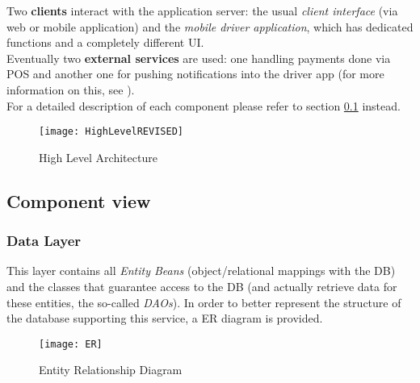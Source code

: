 Two \textbf{clients} interact with the application server: the usual \emph{client interface} (via web or mobile application) and the \emph{mobile driver application}, which has dedicated functions and a completely different UI. \\

Eventually two \textbf{external services} are used: one handling payments done via POS and another one for pushing notifications into the driver app (for more information on this, see \cite{gcm}). \\

For a detailed description of each component please refer to section \ref{sub:component_view} instead.

\begin{sidewaysfigure}
    \centering
    \texttt{[image: HighLevelREVISED]}
    \caption{High Level Architecture}
    \label{fig:hlarch}
\end{sidewaysfigure}

\pagebreak
\subsection{Component view}
\label{sub:component_view}


\subsubsection{Data Layer} %
\label{par:db}
This layer contains all \emph{Entity Beans} (object/relational mappings with the DB) and the classes that guarantee access to the DB (and actually retrieve data for these entities, the so-called \emph{DAOs}).
In order to better represent the structure of the database supporting this service, a ER diagram is provided. 

\begin{figure}
    \centering
    \texttt{[image: ER]}
    \caption{Entity Relationship Diagram}
    \label{fig:er}
\end{figure}

